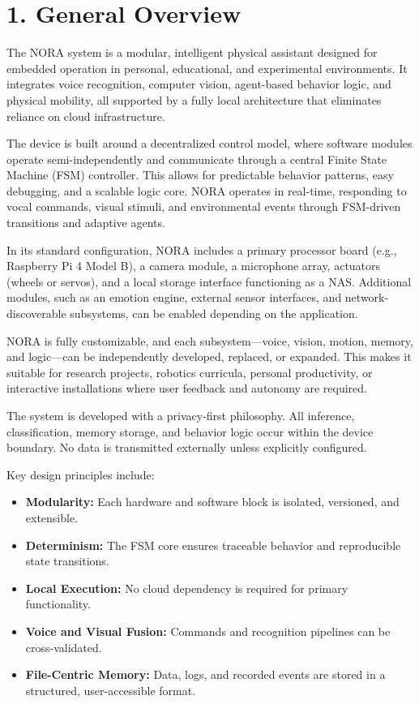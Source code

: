 \section*{1. General Overview}

The NORA system is a modular, intelligent physical assistant designed for embedded operation in personal, educational, and experimental environments. It integrates voice recognition, computer vision, agent-based behavior logic, and physical mobility, all supported by a fully local architecture that eliminates reliance on cloud infrastructure.

The device is built around a decentralized control model, where software modules operate semi-independently and communicate through a central Finite State Machine (FSM) controller. This allows for predictable behavior patterns, easy debugging, and a scalable logic core. NORA operates in real-time, responding to vocal commands, visual stimuli, and environmental events through FSM-driven transitions and adaptive agents.

In its standard configuration, NORA includes a primary processor board (e.g., Raspberry Pi 4 Model B), a camera module, a microphone array, actuators (wheels or servos), and a local storage interface functioning as a NAS. Additional modules, such as an emotion engine, external sensor interfaces, and network-discoverable subsystems, can be enabled depending on the application.

NORA is fully customizable, and each subsystem—voice, vision, motion, memory, and logic—can be independently developed, replaced, or expanded. This makes it suitable for research projects, robotics curricula, personal productivity, or interactive installations where user feedback and autonomy are required.

The system is developed with a privacy-first philosophy. All inference, classification, memory storage, and behavior logic occur within the device boundary. No data is transmitted externally unless explicitly configured.

Key design principles include:
\begin{itemize}
    \item \textbf{Modularity:} Each hardware and software block is isolated, versioned, and extensible.
    \item \textbf{Determinism:} The FSM core ensures traceable behavior and reproducible state transitions.
    \item \textbf{Local Execution:} No cloud dependency is required for primary functionality.
    \item \textbf{Voice and Visual Fusion:} Commands and recognition pipelines can be cross-validated.
    \item \textbf{File-Centric Memory:} Data, logs, and recorded events are stored in a structured, user-accessible format.
\end{itemize}

